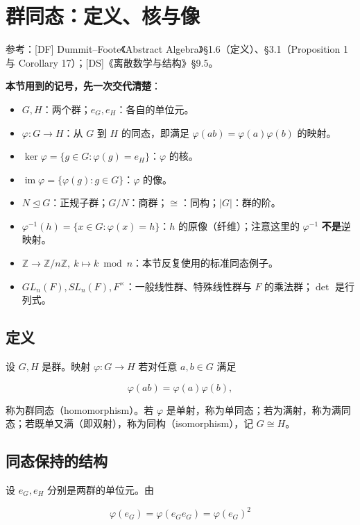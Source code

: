 \section{群同态：定义、核与像}


参考：[DF] Dummit–Foote《Abstract Algebra》§1.6（定义）、§3.1（Proposition 1 与 Corollary 17）；[DS]《离散数学与结构》§9.5。

\textbf{本节用到的记号，先一次交代清楚}：

\begin{itemize}
\item $G,H$：两个群；$e_G,e_H$：各自的单位元。
\item $\varphi:G\to H$：从 $G$ 到 $H$ 的同态，即满足 $\varphi(ab)=\varphi(a)\varphi(b)$ 的映射。
\item $\ker\varphi=\{g\in G:\varphi(g)=e_H\}$：$\varphi$ 的核。
\item $\operatorname{im}\varphi=\{\varphi(g):g\in G\}$：$\varphi$ 的像。
\item $N\trianglelefteq G$：正规子群；$G/N$：商群；$\cong$：同构；$|G|$：群的阶。
\item $\varphi^{-1}(h)=\{x\in G:\varphi(x)=h\}$：$h$ 的原像（纤维）；注意这里的 $\varphi^{-1}$ \textbf{不是}逆映射。
\item $\mathbb Z\to\mathbb Z/n\mathbb Z,\ k\mapsto k\bmod n$：本节反复使用的标准同态例子。
\item $GL_n(F),SL_n(F),F^\times$：一般线性群、特殊线性群与 $F$ 的乘法群；$\det$ 是行列式。
\end{itemize}


\subsection{定义}


设 $G,H$ 是群。映射 $\varphi:G\to H$ 若对任意 $a,b\in G$ 满足

\[\varphi(ab)=\varphi(a)\varphi(b),\]

称为群同态（homomorphism）。若 $\varphi$ 是单射，称为单同态；若为满射，称为满同态；若既单又满（即双射），称为同构（isomorphism），记 $G\cong H$。

\subsection{同态保持的结构}


设 $e_G,e_H$ 分别是两群的单位元。由

\[\varphi(e_G)=\varphi(e_Ge_G)=\varphi(e_G)^2\]

